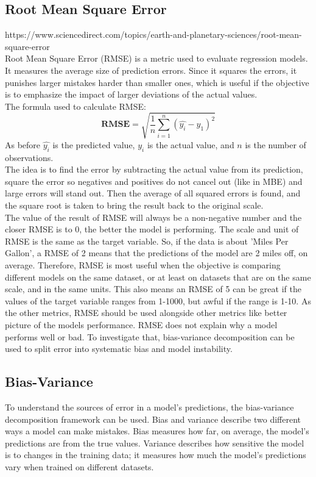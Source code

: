 \newpage

\subsection{Root Mean Square Error}
https://www.sciencedirect.com/topics/earth-and-planetary-sciences/root-mean-square-error    
\\
Root Mean Square Error (RMSE) is a metric used to evaluate regression models. It measures the average size of prediction errors. Since it squares the errors, it punishes larger mistakes harder than smaller ones, which is useful if the objective is to emphasize the impact of larger deviations of the actual values.
\\
The formula used to calculate RMSE:
$$\textbf{RMSE}=\sqrt{\frac{1}{n}\sum_{i=1}^{n}(\hat{y_i}-y_{1})^2}$$
As before $\hat{y_i}$ is the predicted value, $y_i$ is the actual value, and $n$ is the number of observations.
\\ The idea is to find the error by subtracting the actual value from its prediction, square the error so negatives and positives do not cancel out (like in MBE) and large errors will stand out. Then the average of all squared errors is found, and the square root is taken to bring the result back to the original scale. 
\\

The value of the result of RMSE will always be a non-negative number and the closer RMSE is to 0, the better the model is performing. The scale and unit of RMSE is the same as the target variable. So, if the data is about 'Miles Per Gallon', a RMSE of 2 means that the predictions of the model are 2 miles off, on average. Therefore, RMSE is most useful when the objective is comparing different models on the same dataset, or at least on datasets that are on the same scale, and in the same units. This also means an RMSE of 5 can be great if the values of the target variable ranges from 1-1000, but awful if the range is 1-10. As the other metrics, RMSE should be used alongside other metrics like better picture of the models performance. RMSE does not explain why a model performs well or bad. To investigate that, bias-variance decomposition can be used to split error into systematic bias and model instability.
\newpage

\subsection{Bias-Variance}
To understand the sources of error in a model’s predictions, the bias-variance decomposition framework can be used. Bias and variance describe two different ways a model can make mistakes. Bias measures how far, on average, the model's predictions are from the true values. Variance describes how sensitive the model is to changes in the training data; it measures how much the model’s predictions vary when trained on different datasets. 

